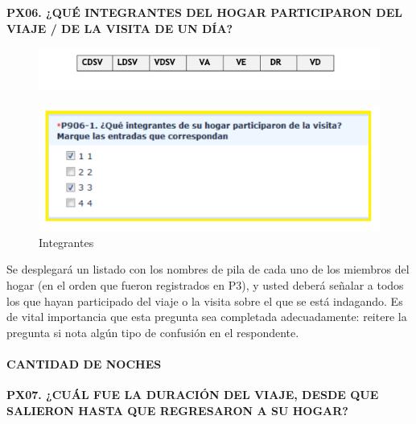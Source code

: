\documentclass[
  openany]{book}
\begin{document}
\textbf{PX06. ¿QUÉ INTEGRANTES DEL HOGAR PARTICIPARON DEL VIAJE / DE LA VISITA DE UN DÍA?}

\begin{figure}

{\centering \includegraphics[width=1\linewidth]{imagenes/figura6-92} 

}

\end{figure}

\begin{figure}

{\centering \includegraphics[width=1\linewidth]{imagenes/figura6-93} 

}

\caption{Integrantes}\label{fig:integrant}
\end{figure}

Se desplegará un listado con los nombres de pila de cada uno de los miembros del hogar (en el orden que fueron registrados en P3), y usted deberá señalar a todos los que hayan participado del viaje o la visita sobre el que se está indagando. Es de vital importancia que esta pregunta sea completada adecuadamente: reitere la pregunta si nota algún tipo de confusión en el respondente.

\hypertarget{cantidad-de-noches}{%
\paragraph{\texorpdfstring{\textbf{CANTIDAD DE NOCHES}}{CANTIDAD DE NOCHES}}\label{cantidad-de-noches}}

\textbf{PX07. ¿CUÁL FUE LA DURACIÓN DEL VIAJE, DESDE QUE SALIERON HASTA QUE REGRESARON A SU HOGAR?}
\end{document}
